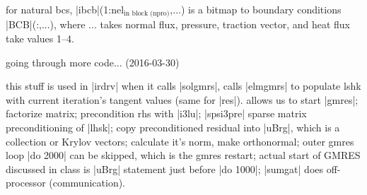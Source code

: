 \documentclass[11pt]{article}
\begin{document}
for natural bcs, |ibcb|(1:nel$_\text{in block (npro)}$,...) is a bitmap to boundary conditions |BCB|(:,...), where ... takes normal flux, pressure, traction vector, and heat flux take values 1--4.

going through more code... (2016-03-30)

this stuff is used in |irdrv| when it calls |solgmrs|, calls |elmgmrs| to populate lshk with current iteration's tangent values (same for |res|). allows us to start |gmres|; factorize matrix; precondition rhs with |i3lu|; |spsi3pre| sparse matrix preconditioning of |lhsk|; copy preconditioned residual into |uBrg|, which is a collection or Krylov vectors; calculate it's norm, make orthonormal; outer gmres loop |do 2000| can be skipped, which is the gmres restart; actual start of GMRES discussed in class is |uBrg| statement just before |do 1000|; |sumgat| does off-processor (communication).
\end{document}
